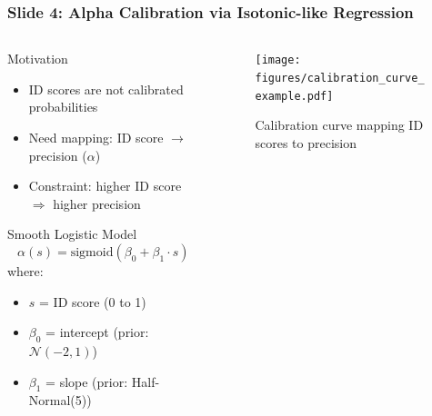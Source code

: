 \documentclass[a4paper,8pt]{beamer}
\begin{document}
\begin{frame}
\frametitle{Slide 4: Alpha Calibration via Isotonic-like Regression}
\begin{columns}
\begin{column}{0.55\textwidth}
    \begin{block}{Motivation}
        \begin{itemize}
            \item ID scores are not calibrated probabilities
            \item Need mapping: ID score $\rightarrow$ precision ($\alpha$)
            \item Constraint: higher ID score $\Rightarrow$ higher precision
        \end{itemize}
    \end{block}
    
    \begin{block}{Smooth Logistic Model}
        \begin{equation*}
            \alpha(s) = \text{sigmoid}(\beta_0 + \beta_1 \cdot s)
        \end{equation*}
        where:
        \begin{itemize}
            \item $s$ = ID score (0 to 1)
            \item $\beta_0$ = intercept (prior: $\mathcal{N}(-2, 1)$)
            \item $\beta_1$ = slope (prior: Half-Normal(5))
        \end{itemize}
    \end{block}
\end{column}

\begin{column}{0.45\textwidth}
    \begin{figure}
        \centering
        \texttt{[image: figures/calibration\_curve\_example.pdf]}
        \caption{Calibration curve mapping ID scores to precision}
    \end{figure}
\end{column}
\end{columns}
\end{frame}
\end{document}
